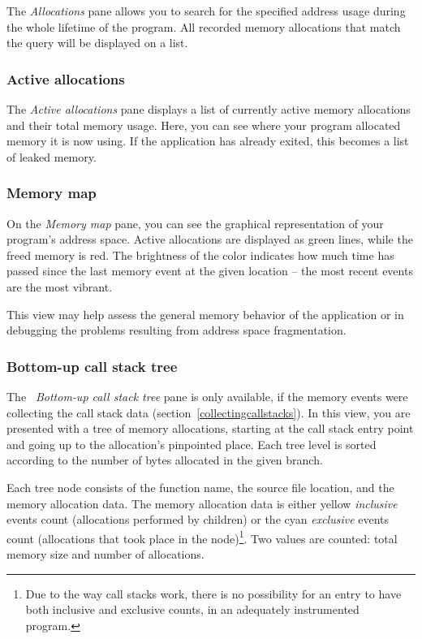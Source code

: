 \documentclass[hidelinks,titlepage,a4paper]{article}
\begin{document}
The \emph{\faAt{} Allocations} pane allows you to search for the specified address usage during the whole lifetime of the program. All recorded memory allocations that match the query will be displayed on a list.

\subsubsection{Active allocations}

The \emph{\faHeartbeat{} Active allocations} pane displays a list of currently active memory allocations and their total memory usage. Here, you can see where your program allocated memory it is now using. If the application has already exited, this becomes a list of leaked memory.

\subsubsection{Memory map}

On the \emph{\faMap{} Memory map} pane, you can see the graphical representation of your program's address space. Active allocations are displayed as green lines, while the freed memory is red. The brightness of the color indicates how much time has passed since the last memory event at the given location -- the most recent events are the most vibrant.

This view may help assess the general memory behavior of the application or in debugging the problems resulting from address space fragmentation.

\subsubsection{Bottom-up call stack tree}
\label{callstacktree}

The \emph{\faTree{}~Bottom-up call stack tree} pane is only available, if the memory events were collecting the call stack data (section~\ref{collectingcallstacks}). In this view, you are presented with a tree of memory allocations, starting at the call stack entry point and going up to the allocation's pinpointed place. Each tree level is sorted according to the number of bytes allocated in the given branch.

Each tree node consists of the function name, the source file location, and the memory allocation data. The memory allocation data is either yellow \emph{inclusive} events count (allocations performed by children) or the cyan \emph{exclusive} events count (allocations that took place in the node)\footnote{Due to the way call stacks work, there is no possibility for an entry to have both inclusive and exclusive counts, in an adequately instrumented program.}. Two values are counted: total memory size and number of allocations.
\end{document}
